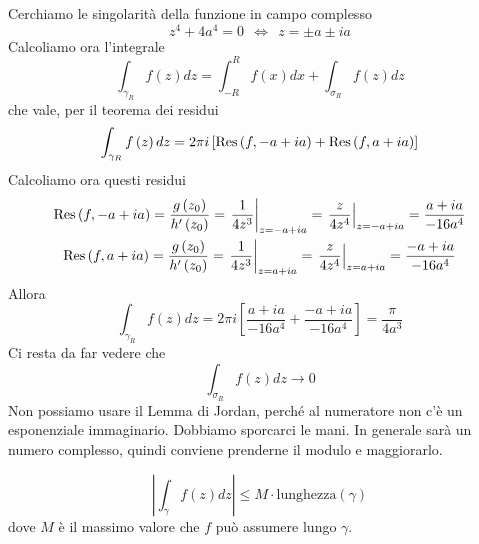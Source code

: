 \begin{figure}[htpb]
\end{figure}
\FloatBarrier

Cerchiamo le singolarità della funzione in campo complesso
\begin{equation*}
z^{4} +4a^{4} =0\ \ \iff \ \ z=\pm a\pm ia
\end{equation*}
Calcoliamo ora l'integrale
\begin{equation*}
\int _{\gamma _{R}} f\left( z\right) dz=\int ^{R}_{-R} f\left( x\right) dx+\int _{\sigma _{R}} f\left( z\right) dz
\end{equation*}
che vale, per il teorema dei residui
\begin{equation*}
\int _{\gamma _{R}} f\left( z\right) dz=2\pi i\left[\operatorname{Res} \left( f,-a+ia\right) +\operatorname{Res} \left( f,a+ia\right)\right]
\end{equation*}
Calcoliamo ora questi residui
\begin{gather*}
\operatorname{Res} \left( f,-a+ia\right) =\frac{g\left( z_{0}\right)}{h'\left( z_{0}\right)} =\left. \frac{1}{4z^{3}}\right| _{z=-a+ia} =\left. \frac{z}{4z^{4}}\right| _{z=-a+ia} =\frac{a+ia}{-16a^{4}}\\
\operatorname{Res} \left( f,a+ia\right) =\frac{g\left( z_{0}\right)}{h'\left( z_{0}\right)} =\left. \frac{1}{4z^{3}}\right| _{z=a+ia} =\left. \frac{z}{4z^{4}}\right| _{z=a+ia} =\frac{-a+ia}{-16a^{4}}
\end{gather*}
Allora
\begin{equation*}
\int _{\gamma _{R}} f\left( z\right) dz=2\pi i\left[\frac{a+ia}{-16a^{4}} +\frac{-a+ia}{-16a^{4}}\right] =\frac{\pi }{4a^{3}}
\end{equation*}
Ci resta da far vedere che
\begin{equation*}
\int _{\sigma _{R}} f\left( z\right) dz\rightarrow 0
\end{equation*}
Non possiamo usare il Lemma di Jordan, perché al numeratore non c'è un esponenziale immaginario. Dobbiamo sporcarci le mani. In generale sarà un numero complesso, quindi conviene prenderne il modulo e maggiorarlo.
\begin{rem}
\begin{equation*}
\left| \int _{\gamma } f\left( z\right) dz\right| \leqslant M\cdotp \text{lunghezza}\left( \gamma \right)
\end{equation*}
dove $M$ è il massimo valore che $f$ può assumere lungo $\gamma $.
\end{rem}
